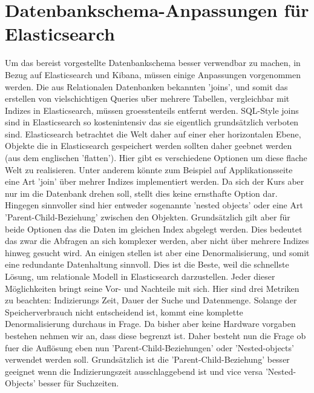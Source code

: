 \documentclass[twocolumn,10pt]{asme2ej}
\begin{document}
	\section{Datenbankschema-Anpassungen f\"ur Elasticsearch}
	Um das bereist vorgestellte Datenbankschema besser verwendbar zu machen, in Bezug auf Elasticsearch und Kibana, m\"ussen einige Anpassungen vorgenommen werden. Die aus Relationalen Datenbanken bekannten 'joins', und somit das erstellen von vielschichtigen Queries u\"ber mehrere Tabellen, vergleichbar mit Indizes in Elasticsearch, m\"ussen groesstenteils entfernt werden. SQL-Style joins sind in Elasticsearch so kostenintensiv das sie eigentlich grunds\"atzlich verboten sind\cite{esjoins}.
	Elasticsearch betrachtet die Welt daher auf einer eher horizontalen Ebene\cite[Chapter~40]{esDg}, Objekte die in Elasticsearch gespeichert werden sollten daher geebnet werden (aus dem englischen 'flatten'). \newline
	Hier gibt es verschiedene Optionen um diese flache Welt zu realisieren. Unter anderem k\"onnte zum Beispiel auf Applikationsseite eine Art 'join' \"uber mehrer Indizes implementiert werden. Da sich der Kurs aber nur im die Datenbank drehen soll, stellt dies keine ernsthafte Option dar. Hingegen sinnvoller sind hier entweder sogenannte 'nested objects' \cite[Chapter~41]{esDg} oder eine Art 'Parent-Child-Beziehung' zwischen den Objekten\cite[Chapter~42]{esDg}. Grunds\"atzlich gilt aber f\"ur beide Optionen das die Daten im gleichen Index abgelegt werden. Dies bedeutet das zwar die Abfragen an sich komplexer werden, aber nicht \"uber mehrere Indizes hinweg gesucht wird. \newline
	An einigen stellen ist aber eine Denormalisierung, und somit eine redundante Datenhaltung sinnvoll. Dies ist die Beste, weil die schnellste L\"osung, um relationale Modell in Elasticsearch darzustellen. \newline
	Jeder dieser M\"oglichkeiten bringt seine Vor- und Nachteile mit sich. Hier sind drei Metriken zu beachten: Indizierungs Zeit, Dauer der Suche und Datenmenge. Solange der Speicherverbrauch nicht entscheidend ist, kommt eine komplette Denormalisierung durchaus in Frage. Da bisher aber keine Hardware vorgaben bestehen nehmen wir an, dass diese begrenzt ist. Daher besteht nun die Frage ob fuer die Aufl\"osung eben nun 'Parent-Child-Beziehungen' oder 'Nested-objects' verwendet werden soll. Grunds\"atzlich ist die 'Parent-Child-Beziehung' besser geeignet wenn die Indizierungszeit\cite[Chapter~42]{esDg} ausschlaggebend ist und vice versa 'Nested-Objects' besser f\"ur Suchzeiten.\newline 
\end{document}
